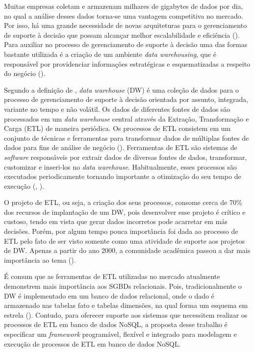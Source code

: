 Muitas empresas coletam e armazenam milhares de gigabytes de dados por dia, no qual a análise desses dados torna-se uma vantagem competitiva no mercado. Por isso, há uma grande necessidade de novas arquiteturas para o gerenciamento de suporte à decisão que possam alcançar melhor escalabilidade e eficiência (\cite{liu:2013}). Para auxiliar no processo de gerenciamento de suporte à decisão uma das formas bastante utilizada é a criação de um ambiente \textit{data warehousing}, que é responsável por providenciar informações estratégicas e esquematizadas a respeito do negócio (\cite{dayal:1997}).

Segundo a definição de \cite{kimball:2002}, \textit{data warehouse} (DW) é uma coleção de dados para o processo de gerenciamento de suporte à decisão orientada por assunto, integrada, variante no tempo e não volátil. Os dados de diferentes fontes de dados são processados em um \textit{data warehouse} central através da Extração, Transformação e Carga (ETL) de maneira periódica. Os processos de ETL consistem em um conjunto de técnicas e ferramentas para transformar dados de múltiplas fontes de dados para fins de análise de negócio (\cite{silva:2016}). Ferramentas de ETL são sistemas de \textit{software} responsáveis por extrair dados de diversas fontes de dados, transformar, customizar e inseri-los no \textit{data warehouse}. Habitualmente, esses processos são executados periodicamente tornando importante a otimização do seu tempo de execução (\cite{vassiliadis:2005}, \cite{silva:2016}).

O projeto de ETL, ou seja, a criação dos seus processos, consome cerca de 70\% dos recursos de implantação de um DW, pois desenvolver esse projeto é crítico e custoso, tendo em vista que gerar dados incorretos pode acarretar em más decisões. Porém, por algum tempo pouca importância foi dada ao processo de ETL pelo fato de ser visto somente como uma atividade de suporte aos projetos de DW. Apenas a partir do ano 2000, a comunidade acadêmica passou a dar mais importância ao tema (\cite{silva:2012}).

É comum que as ferramentas de ETL utilizadas no mercado atualmente demonstrem mais importância aos SGBDs relacionais. Pois, tradicionalmente o DW é implementado em um banco de dados relacional, onde o dado é armazenado nas tabelas fato e tabelas dimensões, na qual forma um esquema em estrela (\cite{kimball:2002}). Contudo, para oferecer suporte aos sistemas que necessitem realizar os processos de ETL em banco de dados NoSQL, a proposta desse trabalho é especificar um \textit{framework} programável, flexível e integrado para modelagem e execução de processos de ETL em banco de dados NoSQL.

